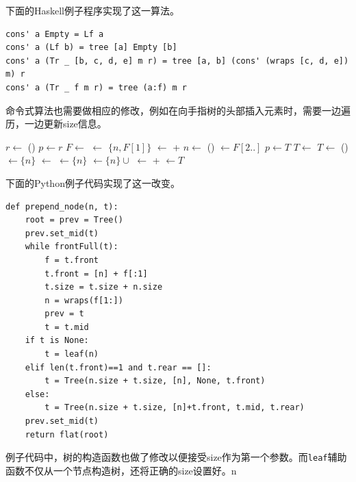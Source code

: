 \documentclass[b5paper]{ctexart}
\begin{document}
下面的Haskell例子程序实现了这一算法。

\begin{lstlisting}[style=Haskell]
cons' a Empty = Lf a
cons' a (Lf b) = tree [a] Empty [b]
cons' a (Tr _ [b, c, d, e] m r) = tree [a, b] (cons' (wraps [c, d, e]) m) r
cons' a (Tr _ f m r) = tree (a:f) m r
\end{lstlisting}

命令式算法也需要做相应的修改，例如在向手指树的头部插入元素时，需要一边遍历，一边更新size信息。

\begin{algorithmic}
  \State $r \gets $ ()
  \State $p \gets r$
  \State {}
    \State $F \gets $ 
    \State {} $\gets$ $\{n, F[1]\}$
    \State {} $\gets$  +  
    \State $n \gets$ ()
    \State {} $\gets F[2..]$
    \State $p \gets T$
    \State $T \gets$ 
  \EndWhile
    \State $T \gets$ ()
    \State {}$\gets \{ n \}$
    \State {} $\gets$ 
    \State {} $\gets \{ n \}$
  \Else
    \State {} $\gets \{ n \} \cup $ 
  \EndIf
  \State {} $\gets$  +  
  \State {} $\gets T$
  \State \Return {}
\EndFunction
\end{algorithmic}

下面的Python例子代码实现了这一改变。

\lstset{language=Python}
\begin{lstlisting}
def prepend_node(n, t):
    root = prev = Tree()
    prev.set_mid(t)
    while frontFull(t):
        f = t.front
        t.front = [n] + f[:1]
        t.size = t.size + n.size
        n = wraps(f[1:])
        prev = t
        t = t.mid
    if t is None:
        t = leaf(n)
    elif len(t.front)==1 and t.rear == []:
        t = Tree(n.size + t.size, [n], None, t.front)
    else:
        t = Tree(n.size + t.size, [n]+t.front, t.mid, t.rear)
    prev.set_mid(t)
    return flat(root)
\end{lstlisting}

例子代码中，树的构造函数也做了修改以便接受size作为第一个参数。而\texttt{leaf}辅助函数不仅从一个节点构造树，还将正确的size设置好。n
\end{document}
